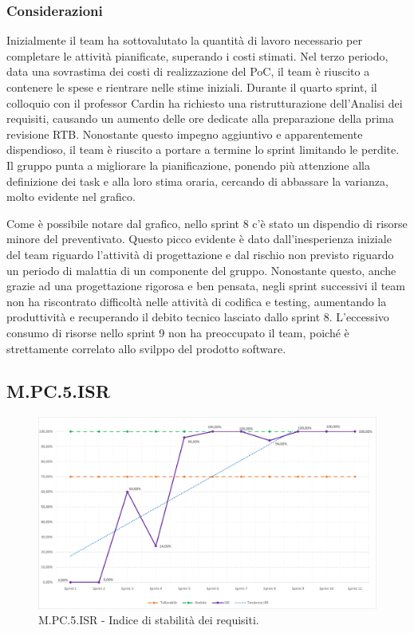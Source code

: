 \documentclass[10pt, a4paper]{article}
\begin{document}
\subsubsection{Considerazioni}
Inizialmente il team ha sottovalutato la quantità di lavoro necessario per completare le attività pianificate, superando i costi stimati.
Nel terzo periodo, data una sovrastima dei costi di realizzazione del PoC, il team è riuscito a contenere le spese e rientrare nelle stime iniziali.
Durante il quarto sprint, il colloquio con il professor Cardin ha richiesto una ristrutturazione dell'Analisi dei requisiti, causando un aumento delle ore dedicate alla preparazione della prima revisione RTB.
Nonostante questo impegno aggiuntivo e apparentemente dispendioso, il team è riuscito a portare a termine lo sprint limitando le perdite.
Il gruppo punta a migliorare la pianificazione, ponendo più attenzione alla definizione dei task e alla loro stima oraria, cercando di abbassare la varianza, molto evidente nel grafico.

Come è possibile notare dal grafico, nello sprint 8 c'è stato un dispendio di risorse minore del preventivato. Questo picco evidente è dato dall'inesperienza iniziale del team riguardo l'attività di progettazione e dal rischio non previsto riguardo un periodo di malattia di un componente del gruppo. Nonostante questo, anche grazie ad una progettazione rigorosa e ben pensata, negli sprint successivi il team non ha riscontrato difficoltà nelle attività di codifica e testing, aumentando la produttività e recuperando il debito tecnico lasciato dallo sprint 8. L'eccessivo consumo di risorse nello sprint 9  non ha preoccupato il team, poiché è strettamente correlato allo svilppo del prodotto software.

\subsection{M.PC.5.ISR}
\begin{figure}[H]
\includegraphics[width=15.5cm]{img/metriche/MPC5ISR.png}
\caption{M.PC.5.ISR - Indice di stabilità dei requisiti.}
\end{figure}
\end{document}
